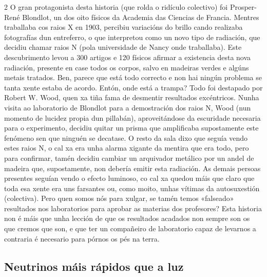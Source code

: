 \begin{multicols}{2}
O gran protagonista desta historia (que rolda o ridículo colectivo) foi
Prosper-René Blondlot, un dos oito físicos da Academia das Ciencias de Francia.
Mentres traballaba cos raios X en 1903, percibiu variacións do brillo cando
realizaba fotografías dun entreferro, o que interpretou como un novo tipo de
radiación, que decidiu chamar raios N (pola universidade de Nancy onde
traballaba). Este descubrimento levou a 300 artigos e 120 físicos afirmar a
existencia desta nova radiación, presente en case todos os corpos, salvo en
madeiras verdes e algúns metais tratados. Ben, parece que está todo correcto e
non hai ningún problema se tanta xente estaba de acordo. Entón, onde está a
trampa? Todo foi destapado por Robert W. Wood, quen xa tiña fama de desmentir
resultados excéntricos. Nunha visita ao laboratorio de Blondlot para a
demostración dos raios N, Wood (nun momento de lucidez propia dun pillabán),
aproveitándose da escuridade necesaria para o experimento, decidiu quitar un
prisma que amplificaba supostamente este fenómeno sen que ninguén se decatase.
O resto da sala dixo que seguía vendo estes raios N, o cal xa era unha alarma
xigante da mentira que era todo, pero para confirmar, tamén decidiu cambiar un
arquivador metálico por un andel de madeira que, supostamente, non debería
emitir esta radiación. As demais persoas presentes seguían vendo o efecto
luminoso, co cal xa quedou máis que claro que toda esa xente era uns farsantes
ou, como moito, unhas vítimas da autosuxestión (colectiva). Pero quen somos nós
para xulgar, se tamén temos «falseado» resultados nos laboratorios para
aprobar as materias dos profesores? Esta historia non é máis que unha lección de %
que os resultados acadados non sempre son os que cremos que son, e que ter un %
compañeiro de laboratorio capaz de levarnos a contraria é necesario para pórnos
os pés na terra.

\subsection*{Neutrinos máis rápidos que a luz}


\end{multicols}
